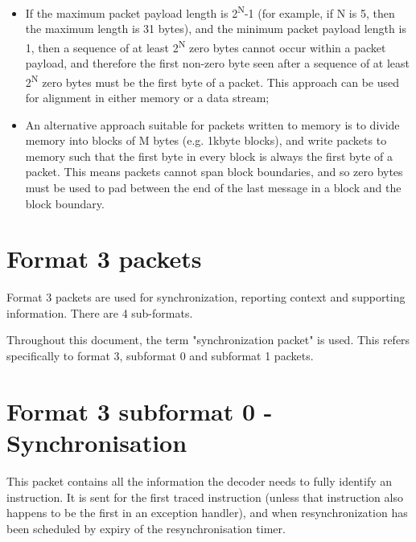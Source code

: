 \begin{itemize}
  \item If the maximum packet payload length is 2\textsuperscript{N}-1 (for example, if N is 5, then the maximum length is
    31 bytes), and the minimum packet payload length is 1, then a sequence of at least 2\textsuperscript{N} zero 
    bytes cannot occur within a packet payload, and therefore the first non-zero byte seen after a sequence of 
    at least 2\textsuperscript{N} zero bytes must be the first byte of a packet.  This approach can be used for
    alignment in either memory or a data stream;
  \item An alternative approach suitable for packets written to memory is to divide memory into blocks of M bytes
    (e.g. 1kbyte blocks), and write packets to memory such that the first byte in every block is always the first
    byte of a packet.  This means packets cannot span block boundaries, and so zero bytes must be used to pad between 
    the end of the last message in a block and the block boundary.
\end{itemize}

\section{Format 3 packets} \label{sec:format3}

Format 3 packets are used for synchronization, reporting context and supporting information.  There are 4
sub-formats.

Throughout this document, the term "synchronization packet" is used.  This refers specifically to format 3, 
subformat 0 and subformat 1 packets.

\section{Format 3 subformat 0 - Synchronisation} \label{sec:format30}

This packet contains all the information the decoder needs to fully identify an instruction.  It is sent for
the first traced instruction (unless that instruction also happens to be the first in an exception handler), 
and when resynchronization has been scheduled by expiry of the resynchronisation timer.


